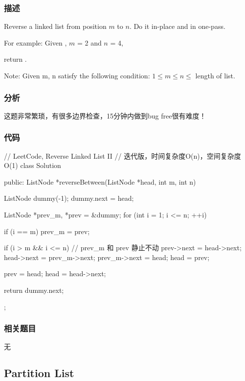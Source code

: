 \subsubsection{描述}
Reverse a linked list from position $m$ to $n$. Do it in-place and in one-pass.

For example:
Given , $m$ = 2 and $n$ = 4,

return .

Note:
Given m, n satisfy the following condition:
$1 \leq m \leq  n \leq $ length of list.


\subsubsection{分析}
这题非常繁琐，有很多边界检查，15分钟内做到bug free很有难度！


\subsubsection{代码}
\begin{Code}
// LeetCode, Reverse Linked List II
// 迭代版，时间复杂度O(n)，空间复杂度O(1)
class Solution {
public:
    ListNode *reverseBetween(ListNode *head, int m, int n) {
        ListNode dummy(-1);
        dummy.next = head;

        ListNode *prev_m, *prev = &dummy;
        for (int i = 1; i <= n; ++i) {
            if (i == m) prev_m = prev;

            if (i > m && i <= n) { // prev_m 和 prev 静止不动
                prev->next = head->next;
                head->next = prev_m->next;
                prev_m->next = head;
                head = prev;
            }

            prev = head;
            head = head->next;
        }

        return dummy.next;
    }
};
\end{Code}


\subsubsection{相关题目}

\begindot
\item 无
\myenddot


\subsection{Partition List}
\label{sec:partition-list}


